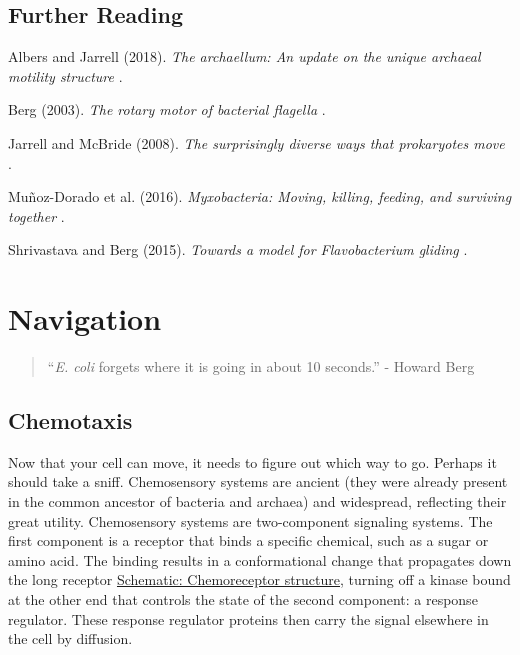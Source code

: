 \documentclass[]{tufte-book}
\begin{document}
\section{Further Reading}\label{further-reading}

Albers and Jarrell (2018). \emph{The archaellum: An update on the unique
archaeal motility structure} \citep{albers2018}.

Berg (2003). \emph{The rotary motor of bacterial flagella}
\citep{berg2003}.

Jarrell and McBride (2008). \emph{The surprisingly diverse ways that
prokaryotes move} \citep{jarrell2008}.

Muñoz-Dorado et al. (2016). \emph{Myxobacteria: Moving, killing,
feeding, and surviving together} \citep{munoz-dorado2016}.

Shrivastava and Berg (2015). \emph{Towards a model for Flavobacterium
gliding} \citep{shrivastava2015}.

\chapter{Navigation}\label{navigation}

\begin{quote}
``\emph{E. coli} forgets where it is going in about 10 seconds.'' -
Howard Berg \citep{berg1988}
\end{quote}

\section{Chemotaxis}\label{chemotaxis}

Now that your cell can move, it needs to figure out which way to go.
Perhaps it should take a sniff. Chemosensory systems are ancient (they
were already present in the common ancestor of bacteria and archaea) and
widespread, reflecting their great utility. Chemosensory systems are
two-component signaling systems. The first component is a receptor that
binds a specific chemical, such as a sugar or amino acid. The binding
results in a conformational change that propagates down the long
receptor \protect\hyperlink{Chemoreceptor_structure}{Schematic:
Chemoreceptor structure}, turning off a kinase bound at the other end
that controls the state of the second component: a response regulator.
These response regulator proteins then carry the signal elsewhere in the
cell by diffusion.
\end{document}
